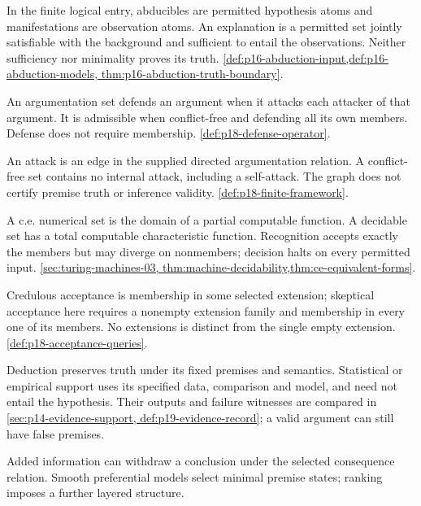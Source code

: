 \begin{description}[style=nextline,leftmargin=0pt]
\item[Abduction; abducibles; manifestations.]
In the finite logical entry, abducibles are permitted hypothesis atoms and
manifestations are observation atoms. An explanation is a permitted set
jointly satisfiable with the background and sufficient to entail the
observations. Neither sufficiency nor minimality proves its truth.
\cref{def:p16-abduction-input,def:p16-abduction-models,
thm:p16-abduction-truth-boundary}.
\item[Admissibility; defense.]
An argumentation set defends an argument when it attacks each attacker of
that argument. It is admissible when conflict-free and defending all its
own members. Defense does not require membership.
\cref{def:p18-defense-operator}.
\item[Attack; conflict-free set.]
An attack is an edge in the supplied directed argumentation relation. A
conflict-free set contains no internal attack, including a self-attack.
The graph does not certify premise truth or inference validity.
\cref{def:p18-finite-framework}.
\item[Computably enumerable; decidable; recognition.]
A c.e. numerical set is the domain of a partial computable function.
A decidable set has a total computable characteristic function. Recognition
accepts exactly the members but may diverge on nonmembers; decision halts
on every permitted input. \cref{sec:turing-machines-03,
thm:machine-decidability,thm:ce-equivalent-forms}.
\item[Credulous; skeptical acceptance.]
Credulous acceptance is membership in some selected extension; skeptical
acceptance here requires a nonempty extension family and membership in
every one of its members. No extensions is distinct from the single empty
extension. \cref{def:p18-acceptance-queries}.
\item[Deduction; inductive support.]
Deduction preserves truth under its fixed premises and semantics. Statistical
or empirical support uses its specified data, comparison and model, and
need not entail the hypothesis. Their outputs and failure witnesses are
compared in \cref{sec:p14-evidence-support,
def:p19-evidence-record}; a valid argument can still have false premises.
\item[Defeasibility; nonmonotonicity.]
Added information can withdraw a conclusion under the selected consequence
relation. Smooth preferential models select minimal premise states;
ranking imposes a further layered structure.

\end{description}

